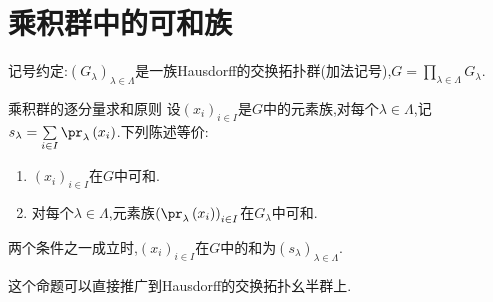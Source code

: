 \section{乘积群中的可和族}

记号约定:$\left(G_{\lambda}\right)_{\lambda\in \Lambda}$是一族Hausdorff的交换拓扑群(加法记号),$G=\prod\limits_{\lambda\in\Lambda}G_{\lambda}$.

\begin{proposition}{乘积群的逐分量求和原则}{}
	设$\left(x_{i}\right)_{i\in I}$是$G$中的元素族,对每个$\lambda\in\Lambda$,记$s_{\lambda}=\sum\limits_{i\in I}\pr_{\lambda}\left(x_{i}\right)$.下列陈述等价:
	\begin{enumerate}
		\item $\left(x_{i}\right)_{i\in I}$在$G$中可和.
		\item 对每个$\lambda\in\Lambda$,元素族$\left(\pr_{\lambda}\left(x_{i}\right)\right)_{i\in I}$在$G_{\lambda}$中可和.
	\end{enumerate}
	两个条件之一成立时,$\left(x_{i}\right)_{i\in I}$在$G$中的和为$\left(s_{\lambda}\right)_{\lambda\in\Lambda}$.
\end{proposition}

\begin{remark}{}{}
	这个命题可以直接推广到Hausdorff的交换拓扑幺半群上.
\end{remark}